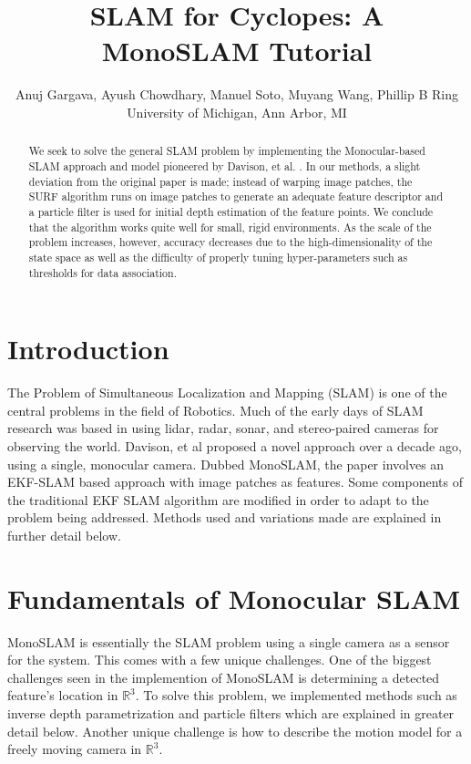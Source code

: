 \documentclass[conference]{IEEEtran}
\begin{document}
\title{SLAM for Cyclopes: A MonoSLAM Tutorial}


\author{Anuj Gargava, Ayush Chowdhary, Manuel Soto, Muyang Wang, Phillip B Ring \\ 
University of Michigan, Ann Arbor, MI }



\maketitle

\IEEEpeerreviewmaketitle

\begin{abstract}
We seek to solve the general SLAM problem by implementing the Monocular-based SLAM approach and model pioneered by Davison, et al. \cite{davison2007monoslam}. In our methods, a slight deviation from the original paper is made; instead of warping image patches, the SURF algorithm runs on image patches to generate an adequate feature descriptor and a particle filter is used for initial depth estimation of the feature points. We conclude that the algorithm works quite well for small, rigid environments. As the scale of the problem increases, however, accuracy decreases due to the  high-dimensionality of the state space as well as the difficulty of properly tuning hyper-parameters such as thresholds for data association.
\end{abstract}

\section{Introduction}
The Problem of Simultaneous Localization and Mapping (SLAM) is one of the central problems in the field of Robotics. Much of the early days of SLAM research was based in using lidar, radar, sonar, and stereo-paired cameras for observing the world. Davison, et al \cite{davison2007monoslam} proposed a novel approach over a decade ago, using a single, monocular camera. Dubbed MonoSLAM, the paper involves an EKF-SLAM based approach with image patches as features. Some components of the traditional EKF SLAM algorithm are modified in order to adapt to the problem being addressed. Methods used and variations made are explained in further detail below.




\section{Fundamentals of Monocular SLAM}
MonoSLAM is essentially the SLAM problem using a single camera as a sensor for the system. This comes with a few unique challenges. One of the biggest challenges seen in the implemention of MonoSLAM is determining a detected feature's location in $\mathbb{R}^3$. To solve this problem, we implemented methods such as inverse depth parametrization and particle filters which are explained in greater detail below. Another unique challenge is how to describe the motion model for a freely moving camera in $\mathbb{R}^3$.
\end{document}

